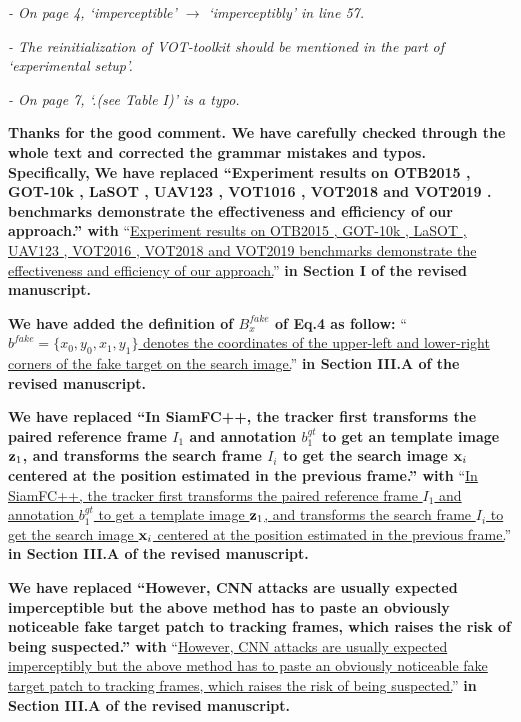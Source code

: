 \documentclass[12pt]{article}
\begin{document}
\textit{- On page 4, ‘imperceptible’ $\rightarrow$ ‘imperceptibly’ in line 57.}

\textit{- The reinitialization of VOT-toolkit should be mentioned in the part of ‘experimental setup’.}

\textit{- On page 7, ‘.(see Table I)’ is a typo.}

\textbf{Thanks for the good comment. We have carefully checked through the whole text and corrected the grammar mistakes and typos. Specifically,}
\textbf{We have replaced ``Experiment results on OTB2015 \cite{OTB}, GOT-10k \cite{GOT-10k}, LaSOT \cite{GOT-10k}, UAV123 \cite{UAV123}, VOT1016 \cite{VOT2016}, VOT2018 \cite{VOT2018} and VOT2019 \cite{VOT2019}. benchmarks demonstrate the effectiveness and efficiency of our approach.'' with}
``\uline{Experiment results on OTB2015 \cite{OTB}, GOT-10k \cite{GOT-10k}, LaSOT \cite{LaSOT}, UAV123 \cite{UAV123}, VOT2016 \cite{VOT2016}, VOT2018 \cite{VOT2018} and VOT2019 \cite{VOT2019} benchmarks demonstrate the effectiveness and efficiency of our approach.}''
\textbf{in Section I of the revised manuscript.}

\textbf{We have added the definition of $B_x^{fake}$ of Eq.4 as follow:}
``\uline{$b^{fake} = \{x_0, y_0, x_1, y_1\}$ denotes the coordinates of the upper-left and lower-right corners of the fake target on the search image.}''
\textbf{in Section III.A of the revised manuscript.}

\textbf{We have replaced ``In SiamFC++, the tracker first transforms the paired reference frame $I_1$ and annotation $b_1^{gt}$ to get an template image $\textbf z_1$, and transforms the search frame $I_i$ to get the search image $\textbf x_i$ centered at the position estimated in the previous frame.'' with}
``\uline{In SiamFC++, the tracker first transforms the paired reference frame $I_1$ and annotation $b_1^{gt}$ to get a template image $\textbf z_1$, and transforms the search frame $I_i$ to get the search image $\textbf x_i$ centered at the position estimated in the previous frame.}''
\textbf{in Section III.A of the revised manuscript.}

\textbf{We have replaced ``However, CNN attacks are usually expected imperceptible but the above method has to paste an obviously noticeable fake target patch to tracking frames, which raises the risk of being suspected.'' with}
``\uline{However, CNN attacks are usually expected imperceptibly but the above method has to paste an obviously noticeable fake target patch to tracking frames, which raises the risk of being suspected.}''
\textbf{in Section III.A of the revised manuscript.}
\end{document}
